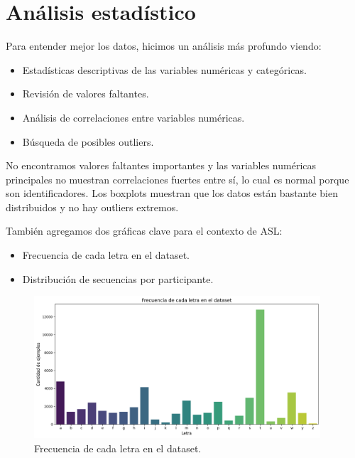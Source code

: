 \documentclass[12pt]{article}
\begin{document}

\section{Análisis estadístico}

Para entender mejor los datos, hicimos un análisis más profundo viendo:
\begin{itemize}
    \item Estadísticas descriptivas de las variables numéricas y categóricas.
    \item Revisión de valores faltantes.
    \item Análisis de correlaciones entre variables numéricas.
    \item Búsqueda de posibles outliers.
\end{itemize}

No encontramos valores faltantes importantes y las variables numéricas principales no muestran correlaciones fuertes entre sí, lo cual es normal porque son identificadores. Los boxplots muestran que los datos están bastante bien distribuidos y no hay outliers extremos.

También agregamos dos gráficas clave para el contexto de ASL:
\begin{itemize}
    \item Frecuencia de cada letra en el dataset.
    \item Distribución de secuencias por participante.
\end{itemize}

\begin{figure}[h]
    \centering
    \includegraphics[width=0.95\textwidth]{grafico_letras.png}
    \caption{Frecuencia de cada letra en el dataset.}
    \label{fig:letras2}
\end{figure}
\end{document}
